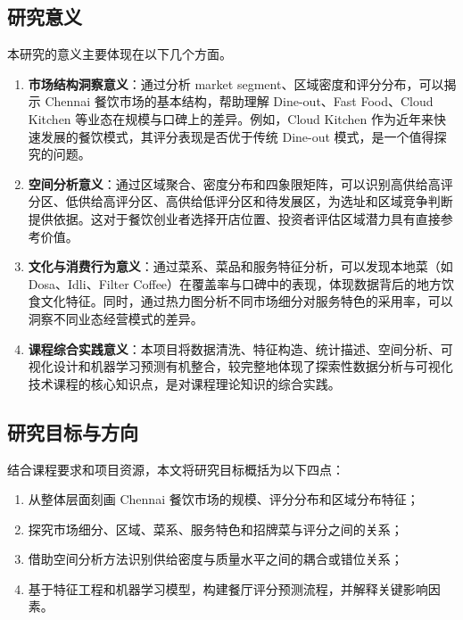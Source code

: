 \documentclass[11pt,a4paper]{article}
\begin{document}
\subsection{研究意义}

本研究的意义主要体现在以下几个方面。

\begin{enumerate}[leftmargin=2em]
    \item \textbf{市场结构洞察意义}：通过分析 market segment、区域密度和评分分布，可以揭示 Chennai 餐饮市场的基本结构，帮助理解 Dine-out、Fast Food、Cloud Kitchen 等业态在规模与口碑上的差异。例如，Cloud Kitchen 作为近年来快速发展的餐饮模式，其评分表现是否优于传统 Dine-out 模式，是一个值得探究的问题。

    \item \textbf{空间分析意义}：通过区域聚合、密度分布和四象限矩阵，可以识别高供给高评分区、低供给高评分区、高供给低评分区和待发展区，为选址和区域竞争判断提供依据。这对于餐饮创业者选择开店位置、投资者评估区域潜力具有直接参考价值。

    \item \textbf{文化与消费行为意义}：通过菜系、菜品和服务特征分析，可以发现本地菜（如 Dosa、Idli、Filter Coffee）在覆盖率与口碑中的表现，体现数据背后的地方饮食文化特征。同时，通过热力图分析不同市场细分对服务特色的采用率，可以洞察不同业态经营模式的差异。

    \item \textbf{课程综合实践意义}：本项目将数据清洗、特征构造、统计描述、空间分析、可视化设计和机器学习预测有机整合，较完整地体现了探索性数据分析与可视化技术课程的核心知识点，是对课程理论知识的综合实践。
\end{enumerate}

\subsection{研究目标与方向}

结合课程要求和项目资源，本文将研究目标概括为以下四点：
\begin{enumerate}[leftmargin=2em]
    \item 从整体层面刻画 Chennai 餐饮市场的规模、评分分布和区域分布特征；
    \item 探究市场细分、区域、菜系、服务特色和招牌菜与评分之间的关系；
    \item 借助空间分析方法识别供给密度与质量水平之间的耦合或错位关系；
    \item 基于特征工程和机器学习模型，构建餐厅评分预测流程，并解释关键影响因素。
\end{enumerate}
\end{document}
